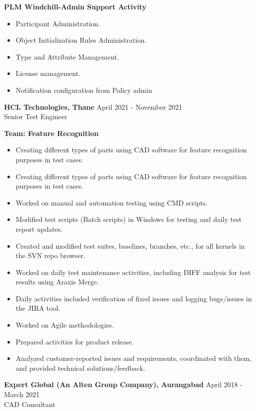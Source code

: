 \documentclass[letterpaper]{twentysecondcv} %
\begin{document}
\item \textbf{PLM Windchill-Admin Support Activity}
\begin{itemize}
    \item Participant Administration.
    \item Object Initialization Rules Administration.
    \item Type and Attribute Management.
    \item License management.
    \item Notification configuration from Policy admin
\end{itemize}
\vspace{10pt}
\textbf{HCL Technologies, Thane} \hfill April 2021 - November 2021  \\
Senior Test Engineer  
\item \textbf{Team: Feature Recognition}
\begin{itemize}
    \item Creating different types of parts using CAD software for feature recognition purposes in test cases.
    \item Creating different types of parts using CAD software for feature recognition purposes in test cases.
    \item Worked on manual and automation testing using CMD scripts.
    \item Modified test scripts (Batch scripts) in Windows for testing and daily test report updates.
    \item Created and modified test suites, baselines, branches, etc., for all kernels in the SVN repo browser.
    \item Worked on daily test maintenance activities, including DIFF analysis for test results using Araxis Merge.
    \item Daily activities included verification of fixed issues and logging bugs/issues in the JIRA tool.
    \item Worked on Agile methodologies.
    \item Prepared activities for product release.
    \item Analyzed customer-reported issues and requirements, coordinated with them, and provided technical solutions/feedback.
\end{itemize}
\vspace{10pt}
\textbf{Expert Global (An Alten Group Company), Aurangabad} \hfill April 2018 - March 2021  \\
CAD Consultant  
\end{document}
